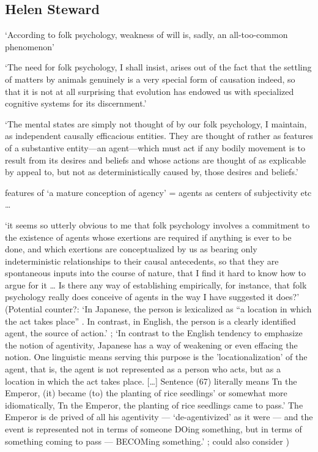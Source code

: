 \documentclass[12pt,\papersize]{extarticle}
\begin{document}
\hypertarget{helen-steward}{%
\subsection{Helen Steward}\label{helen-steward}}

`According to folk psychology, weakness of will is, sadly, an all-too-common phenomenon'\citep[p.~147]{steward:2012_metaphysics}

`The need for folk psychology, I shall insist, arises out of the fact that the settling of matters by animals genuinely is a very special form of causation indeed, so that it is not at all surprising that evolution has endowed us with specialized cognitive systems for its discernment.' \citep[p.~106]{steward:2012_metaphysics}

`The mental states are simply not thought of by our folk psychology, I maintain, as independent causally efficacious entities. They are thought of rather as features of a substantive entity---an agent---which must act if any bodily movement is to result from its desires and beliefs and whose actions are thought of as explicable by appeal to, but not as deterministically caused by, those desires and beliefs.' \citep[p.~77]{steward:2012_metaphysics}

\citet[p.~71--2]{steward:2012_metaphysics} features of `a mature conception of agency' = agents as centers of subjectivity etc \ldots{}

`it seems so utterly obvious to me that folk psychology involves a commitment to the existence of agents whose exertions are required if anything is ever to be done, and which exertions are conceptualized by us as bearing only indeterministic relationships to their causal antecedents, so that they are spontaneous inputs into the course of nature, that I find it hard to know how to argue for it \ldots{} Is there any way of establishing empirically, for instance, that folk psychology really does conceive of agents in the way I have suggested it does?' \citep[p.~97]{steward:2012_metaphysics} (Potential counter?: `In Japanese, the person is lexicalized as ``a location in which the act takes place'' \citep[p.~314]{ikegami:1991_language}. In contrast, in English, the person is a clearly identified agent, the source of action.' \citep{lillard:1998_ethnopsychologies}; `In contrast to the English tendency to emphasize the notion of agentivity, Japanese has a way of weakening or even effacing the notion. One linguistic means serving this purpose is the 'locationalization' of the agent, that is, the agent is not represented as a person who acts, but as a location in which the act takes place. {[}\ldots{]} Sentence (67) literally means Tn the Emperor, (it) became (to) the planting of rice seedlings' or somewhat more idiomatically, Tn the Emperor, the planting of rice seedlings came to pass.' The Emperor is de­ prived of all his agentivity --- `de-agentivized' as it were --- and the event is represented not in terms of someone DOing something, but in terms of something coming to pass --- BECOMing something.' \citep[p.~147]{ikegami:1991_language}; could also consider \citep{yamamoto:2006_agency})
\end{document}
